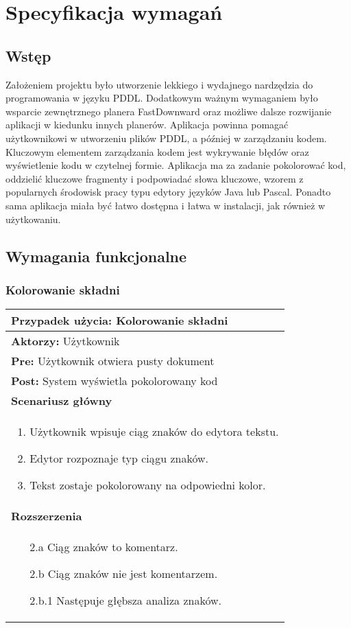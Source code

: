 \chapter{Specyfikacja wymagań}
\label{sec:specyfikacja}
\section{Wstęp}
Założeniem projektu było utworzenie lekkiego i wydajnego nardzędzia do programowania w języku PDDL. Dodatkowym ważnym wymaganiem było wsparcie zewnętrznego planera FastDownward oraz możliwe dalsze rozwijanie aplikacji w kiedunku innych planerów. Aplikacja powinna pomagać użytkownikowi w utworzeniu plików PDDL, a później w zarządzaniu kodem. Kluczowym elementem zarządzania kodem jest wykrywanie błędów oraz wyświetlenie kodu w czytelnej formie. Aplikacja ma za zadanie pokolorować kod, oddzielić kluczowe fragmenty i podpowiadać słowa kluczowe, wzorem z popularnych środowisk pracy typu edytory języków Java lub Pascal. Ponadto sama aplikacja miała być łatwo dostępna i łatwa w instalacji, jak również w użytkowaniu.
\section{Wymagania funkcjonalne}
\subsection{Kolorowanie składni}
\begin{tabular}{|p{\textwidth}|}
\hline 
\textbf{Przypadek użycia:} Kolorowanie składni\\
\hline
\textbf{Aktorzy:} Użytkownik\\
\hline
\textbf{Pre:} Użytkownik otwiera pusty dokument\\
\hline
\textbf{Post:} System wyświetla pokolorowany kod\\
\hline
\textbf{Scenariusz główny}\\
\hline
\begin{enumerate}
\item Użytkownik wpisuje ciąg znaków do edytora tekstu.
\item Edytor rozpoznaje typ ciągu znaków.
\item Tekst zostaje pokolorowany na odpowiedni kolor.
\end{enumerate}\\
\hline
\textbf{Rozszerzenia}\\
\hline
\begin{enumerate}
\item[2.a] Ciąg znaków to komentarz.
\item[2.b] Ciąg znaków nie jest komentarzem.
\item[2.b.1] Następuje głębsza analiza znaków.
\end{enumerate}\\
\hline
\end{tabular} 

